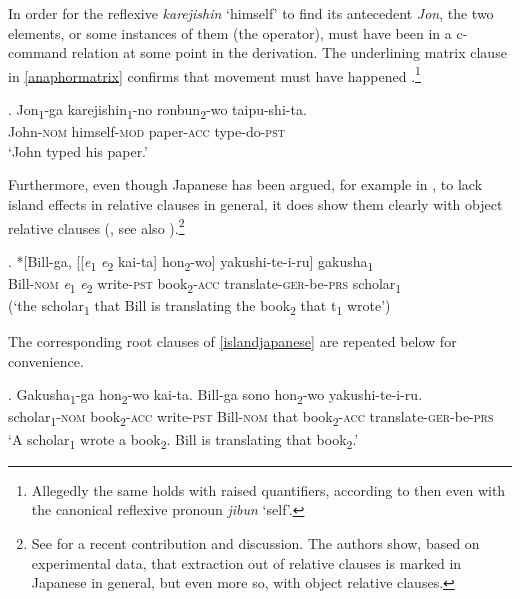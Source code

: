 \documentclass [output=book,colorlinks,citecolor=brown]{langscibook}
\begin{document}
In order for the reflexive \textit{karejishin} `himself’ to find its antecedent \textit{Jon}, the two elements, or some instances of them (the operator), must have been in a c-command relation at some point in the derivation. The underlining matrix clause in \ref{anaphormatrix} confirms that movement must have happened \citep[615–616]{miyamoto:2017:RC}.\footnote{Allegedly the same holds with raised quantifiers, according to \citet{whitman:2013:prehead} then even with the canonical reflexive pronoun \textit{jibun} `self’.}

\exg. Jon\textsubscript{1}-ga karejishin\textsubscript{1}-no ronbun\textsubscript{2}-wo taipu-shi-ta.\\
John-\textsc{nom} himself-\textsc{mod} paper-\textsc{acc} type-do-\textsc{pst}\\
`John typed his paper.’ \label{anaphormatrix}

Furthermore, even though Japanese has been argued, for example in \citet{kuno:1973:structure}, to lack island effects in relative clauses in general, it does show them clearly with object relative clauses (\citealt[623–626]{miyamoto:2017:RC}, see also \citealt[369–373]{whitman:2013:prehead}).\footnote{See \citet{takahashi:2025:relative} for a recent contribution and discussion. The authors show, based on experimental data, that extraction out of relative clauses is marked in Japanese in general, but even more so, with object relative clauses.}

\exg. *[Bill-ga, [[\textit{e}\textsubscript{1} \textit{e}\textsubscript{2} kai-ta] hon\textsubscript{2}-wo] yakushi-te-i-ru] gakusha\textsubscript{1}\\
Bill-\textsc{nom} \textit{e}\textsubscript{1} \textit{e}\textsubscript{2} write-\textsc{pst} book\textsubscript{2}-\textsc{acc} translate-\textsc{ger}-be-\textsc{prs} scholar\textsubscript{1}\\
(`the scholar\textsubscript{1} that Bill is translating the book\textsubscript{2} that t\textsubscript{1} wrote’) \\ \null \hfill \citep[178]{inoue:1976:togo} \label{islandjapanese}

The corresponding root clauses of \ref{islandjapanese} are repeated below for convenience.


\exg. Gakusha\textsubscript{1}-ga hon\textsubscript{2}-wo kai-ta. Bill-ga sono hon\textsubscript{2}-wo yakushi-te-i-ru.\\
scholar\textsubscript{1}-\textsc{nom} book\textsubscript{2}-\textsc{acc} write-\textsc{pst} Bill-\textsc{nom} that book\textsubscript{2}-\textsc{acc} translate-\textsc{ger}-be-\textsc{prs}\\
`A scholar\textsubscript{1} wrote a book\textsubscript{2}. Bill is translating that book\textsubscript{2}.’
\end{document}

